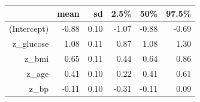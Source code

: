 \begin{table}[ht]
\centering
\begin{tabular}{rrrrrr}
  \hline
 & mean & sd & 2.5\% & 50\% & 97.5\% \\ 
  \hline
(Intercept) & -0.88 & 0.10 & -1.07 & -0.88 & -0.69 \\ 
  z\_glucose & 1.08 & 0.11 & 0.87 & 1.08 & 1.30 \\ 
  z\_bmi & 0.65 & 0.11 & 0.44 & 0.64 & 0.86 \\ 
  z\_age & 0.41 & 0.10 & 0.22 & 0.41 & 0.61 \\ 
  z\_bp & -0.11 & 0.10 & -0.31 & -0.11 & 0.09 \\ 
   \hline
\end{tabular}
\end{table}
